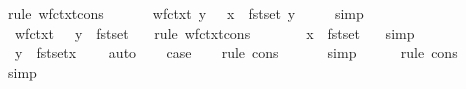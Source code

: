 \begin{isabellebody}
\ {\isacharparenleft}rule\ wf{\isacharunderscore}ctxt{\isacharunderscore}cons{\isacharparenright}\isanewline
\ \ \isamarkupfalse%
\ \isamarkupfalse%
\ {}{\isacharcolon}\ {\isachardoublequoteopen}wf{\isacharunderscore}ctxt\ {\isacharparenleft}{\isacharparenleft}y{\isacharcomma}{\isasympi}{\isacharparenright}\ {\isacharhash}\ {\isasymGamma}{\isacharparenright}{\isachardoublequoteclose}\ {\isachardoublequoteopen}x\ {\isasymnotin}\ fst{\isacharbackquote}set\ {\isacharparenleft}{\isacharparenleft}y{\isacharcomma}{\isasympi}{\isacharparenright}\ {\isacharhash}\ {\isasymGamma}{\isacharparenright}{\isachardoublequoteclose}\ \ \isamarkupfalse%
\ simp{\isacharplus}\isanewline
\ \ \isamarkupfalse%
\ {}{\isacharparenleft}{}{\isacharparenright}\ \isamarkupfalse%
\ {}{\isacharcolon}\ {\isachardoublequoteopen}wf{\isacharunderscore}ctxt\ {\isasymGamma}\ {\isasymand}\ y\ {\isasymnotin}\ fst{\isacharbackquote}set\ {\isasymGamma}{\isachardoublequoteclose}\ \isamarkupfalse%
\ {\isacharparenleft}rule\ wf{\isacharunderscore}ctxt{\isacharunderscore}cons{\isacharparenright}\isanewline
\ \ \isamarkupfalse%
\ {}{\isacharparenleft}{}{\isacharparenright}\ \isamarkupfalse%
\ {}{\isacharcolon}\ {\isachardoublequoteopen}x\ {\isasymnotin}\ fst{\isacharbackquote}set\ {\isasymGamma}{\isachardoublequoteclose}\ \isamarkupfalse%
\ simp\isanewline
\ \ \isamarkupfalse%
\ {}{\isacharparenleft}{}{\isacharparenright}\ {}\ \isamarkupfalse%
\ {}{\isacharcolon}\ {\isachardoublequoteopen}y\ {\isasymnotin}\ fst{\isacharbackquote}set{\isacharparenleft}{\isacharparenleft}x{\isacharcomma}{\isasymsigma}{\isacharparenright}\ {\isacharhash}\ {\isasymGamma}{\isacharparenright}{\isachardoublequoteclose}\ \isamarkupfalse%
\ auto\isanewline
\isanewline
\ \ \isamarkupfalse%
\ {\isacharquery}case\isanewline
\ \ \isamarkupfalse%
\ {\isacharparenleft}rule\ cons{\isacharparenright}\isanewline
\ \ \isamarkupfalse%
\ {}\ \isamarkupfalse%
\ simp\ \ \isanewline
\ \ \isamarkupfalse%
\ {\isacharparenleft}rule\ cons{\isacharparenright}\isanewline
\ \ \isamarkupfalse%
\ {}\ \isamarkupfalse%
\ simp\isanewline
\ \ \isamarkupfalse%
\ {}\ \isamarkupfalse%

\end{isabellebody}
